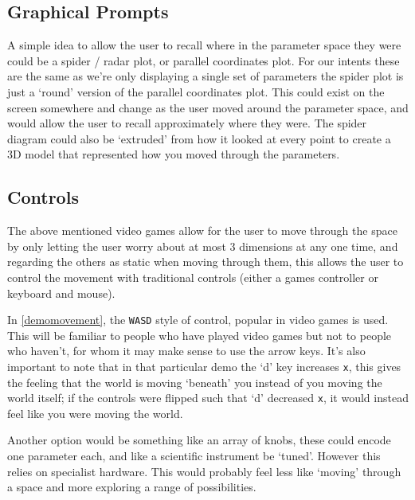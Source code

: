 \subsection{Graphical Prompts}
A simple idea to allow the user to recall where in the parameter space they were
could be a spider / radar plot, or parallel coordinates plot. For our intents these
are the same as we're only displaying a single set of parameters the spider plot
is just a `round' version of the parallel coordinates plot. This could exist on
the screen somewhere and change as the user moved around the parameter space,
and would allow the user to recall approximately where they were. The spider
diagram could also be `extruded' from how it looked at every point to create a
3D model that represented how you moved through the parameters.

\subsection{Controls}
The above mentioned video games allow for the user to move through the space by
only letting the user worry about at most 3 dimensions at any one time, and
regarding the others as static when moving through them, this allows the user to
control the movement with traditional controls (either a games controller or
keyboard and mouse).

In \autoref{demomovement}, the \verb|WASD| style of control, popular in video
games is used. This will be familiar to people who have played video games but
not to people who haven't, for whom it may make sense to use the arrow keys.
It's also important to note that in that particular demo the `d' key increases
\verb|x|, this gives the feeling that the world is moving `beneath' you instead
of you moving the world itself; if the controls were flipped such that `d'
decreased \verb|x|, it would instead feel like you were moving the world. 

Another option would be something like an array of knobs, these could encode one
parameter each, and like a scientific instrument be `tuned'. However this relies
on specialist hardware. This would probably feel less like `moving' through a
space and more exploring a range of possibilities.
